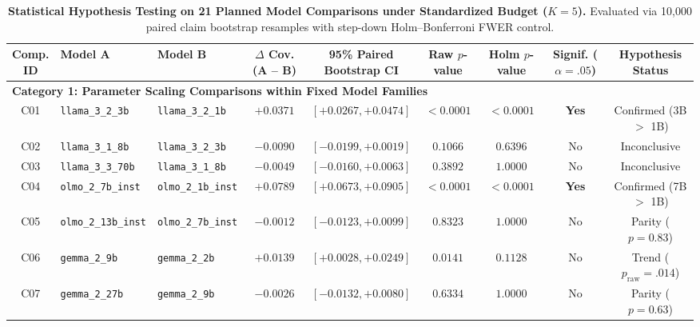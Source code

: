 \documentclass[11pt,a4paper]{article}
\begin{document}
\begin{table}[htbp]
\centering
\small
\caption{\textbf{Statistical Hypothesis Testing on 21 Planned Model Comparisons under Standardized Budget ($K=5$).} Evaluated via 10,000 paired claim bootstrap resamples with step-down Holm--Bonferroni FWER control.}
\label{tab:planned_comparisons}
\setlength{\tabcolsep}{3.5pt}
\begin{adjustbox}{max width=\textwidth}
\begin{tabular}{c l l c c c c c c}
\toprule
\makecell{\textbf{Comp.}\\\textbf{ID}} & \textbf{Model A} & \textbf{Model B} & \makecell{\textbf{$\Delta$ Cov.}\\\textbf{(A -- B)}} & \makecell{\textbf{95\% Paired}\\\textbf{Bootstrap CI}} & \makecell{\textbf{Raw}\\\textbf{$p$-value}} & \makecell{\textbf{Holm}\\\textbf{$p$-value}} & \makecell{\textbf{Signif.}\\\textbf{($\alpha=.05$)}} & \makecell{\textbf{Hypothesis}\\\textbf{Status}} \\
\midrule
\multicolumn{9}{l}{\textbf{Category 1: Parameter Scaling Comparisons within Fixed Model Families}} \\
C01 & \texttt{llama\_3\_2\_3b} & \texttt{llama\_3\_2\_1b} & $+0.0371$ & $[+0.0267, +0.0474]$ & $< 0.0001$ & $< 0.0001$ & \textbf{Yes} & Confirmed (3B $>$ 1B) \\
C02 & \texttt{llama\_3\_1\_8b} & \texttt{llama\_3\_2\_3b} & $-0.0090$ & $[-0.0199, +0.0019]$ & $0.1066$ & $0.6396$ & No & Inconclusive \\
C03 & \texttt{llama\_3\_3\_70b} & \texttt{llama\_3\_1\_8b} & $-0.0049$ & $[-0.0160, +0.0063]$ & $0.3892$ & $1.0000$ & No & Inconclusive \\
C04 & \texttt{olmo\_2\_7b\_inst} & \texttt{olmo\_2\_1b\_inst} & $+0.0789$ & $[+0.0673, +0.0905]$ & $< 0.0001$ & $< 0.0001$ & \textbf{Yes} & Confirmed (7B $>$ 1B) \\
C05 & \texttt{olmo\_2\_13b\_inst} & \texttt{olmo\_2\_7b\_inst} & $-0.0012$ & $[-0.0123, +0.0099]$ & $0.8323$ & $1.0000$ & No & Parity ($p = 0.83$) \\
C06 & \texttt{gemma\_2\_9b} & \texttt{gemma\_2\_2b} & $+0.0139$ & $[+0.0028, +0.0249]$ & $0.0141$ & $0.1128$ & No & Trend ($p_{\text{raw}} = .014$) \\
C07 & \texttt{gemma\_2\_27b} & \texttt{gemma\_2\_9b} & $-0.0026$ & $[-0.0132, +0.0080]$ & $0.6334$ & $1.0000$ & No & Parity ($p = 0.63$) \\

\end{tabular}
\end{adjustbox}
\end{table}
\end{document}
